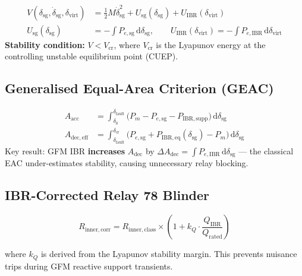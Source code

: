 \documentclass[12pt, a4paper]{report}
\begin{document}
\begin{tcolorbox}[mathbox]
\begin{align}
  V(\delta_\mathrm{sg}, \dot{\delta}_\mathrm{sg}, \delta_\mathrm{virt}) &= \tfrac{1}{2}M\dot{\delta}_\mathrm{sg}^2 + U_\mathrm{sg}(\delta_\mathrm{sg}) + U_\mathrm{IBR}(\delta_\mathrm{virt}) \\[4pt]
  U_\mathrm{sg}(\delta_\mathrm{sg}) &= -\int P_{e,\mathrm{sg}}\,\mathrm{d}\delta_\mathrm{sg}, \qquad
  U_\mathrm{IBR}(\delta_\mathrm{virt}) = -\int P_{e,\mathrm{IBR}}\,\mathrm{d}\delta_\mathrm{virt}
\end{align}
\textbf{Stability condition:} $V < V_\mathrm{cr}$, where $V_\mathrm{cr}$ is the Lyapunov energy at the controlling unstable equilibrium point (CUEP).
\end{tcolorbox}

\subsection{Generalised Equal-Area Criterion (GEAC)}

\begin{tcolorbox}[mathbox]
\begin{align}
  A_\mathrm{acc} &= \int_{\delta_0}^{\delta_\mathrm{fault}} \bigl(P_m - P_{e,\mathrm{sg}} - P_\mathrm{IBR,supp}\bigr)\,\mathrm{d}\delta_\mathrm{sg} \\[4pt]
  A_\mathrm{dec,eff} &= \int_{\delta_\mathrm{fault}}^{\delta_\mathrm{cr}} \bigl(P_{e,\mathrm{sg}} + P_\mathrm{IBR,eq}(\delta_\mathrm{sg}) - P_m\bigr)\,\mathrm{d}\delta_\mathrm{sg}
\end{align}
Key result: GFM IBR \textbf{increases} $A_\mathrm{dec}$ by $\Delta A_\mathrm{dec} = \int P_{e,\mathrm{IBR}}\,\mathrm{d}\delta_\mathrm{sg}$ — the classical EAC under-estimates stability, causing unnecessary relay blocking.
\end{tcolorbox}

\subsection{IBR-Corrected Relay 78 Blinder}

\begin{equation}
  R_\mathrm{inner,corr} = R_\mathrm{inner,class} \times \left(1 + k_Q \cdot \frac{Q_\mathrm{IBR}}{Q_\mathrm{rated}}\right)
\end{equation}

where $k_Q$ is derived from the Lyapunov stability margin. This prevents nuisance trips during GFM reactive support transients.
\end{document}
